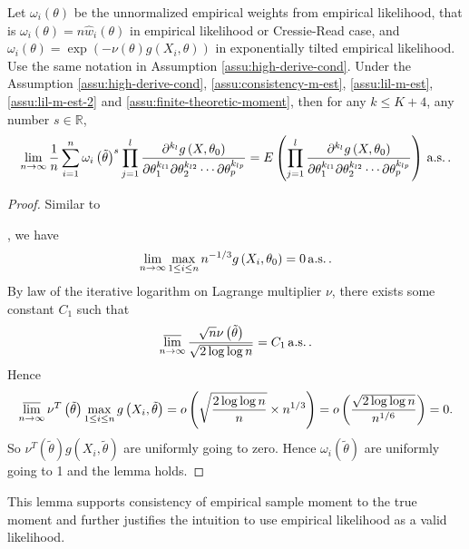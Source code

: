 \begin{lem}
\label{lem:finite-empirical-weight-moment}Let $\omega_{i}\left(\theta\right)$
be the unnormalized empirical weights from empirical likelihood, that
is $\omega_{i}\left(\theta\right)=n\hat{w}_{i}\left(\theta\right)$
in empirical likelihood or Cressie-Read case, and $\omega_{i}\left(\theta\right)=\exp\left(-\nu\left(\theta\right)g\left(X_{i},\theta\right)\right)$
in exponentially tilted empirical likelihood. Use the same notation
in Assumption \ref{assu:high-derive-cond}. Under the Assumption \ref{assu:high-derive-cond},
\ref{assu:consistency-m-est}, \ref{assu:lil-m-est}, \ref{assu:lil-m-est-2} and \ref{assu:finite-theoretic-moment},
then for any $k\le K+4$, any number $s\in\mathbb{R}$, 
\[
\lim_{n\rightarrow\infty}\frac{1}{n}\sum_{i=1}^{n}\omega_{i}\left(\tilde{\theta}\right)^{s}\prod_{j=1}^{l}\frac{\partial^{k_{l}}g\left(X,\theta_{0}\right)}{\partial\theta_{1}^{k_{l1}}\partial\theta_{2}^{k_{l2}}\cdots\partial\theta_{p}^{k_{lp}}}=E\left(\prod_{j=1}^{l}\frac{\partial^{k_{l}}g\left(X,\theta_{0}\right)}{\partial\theta_{1}^{k_{l1}}\partial\theta_{2}^{k_{l2}}\cdots\partial\theta_{p}^{k_{lp}}}\right)\,\mathrm{a.s.}\,.
\]
\end{lem}
\begin{proof}
Similar to%
\begin{comment}
add detail lemma number
\end{comment}
{} \citet{owen2010empirical}, we have 
\[
\lim_{n\rightarrow\infty}\max_{1\le i\le n}n^{-1/3}g\left(X_{i},\theta_{0}\right)=0\,\mathrm{a.s.}\,.
\]
By law of the iterative logarithm on Lagrange multiplier $\nu$, there
exists some constant $C_{1}$ such that 
\[
\varlimsup_{n\rightarrow\infty}\frac{\sqrt{n}\nu\left(\tilde{\theta}\right)}{\sqrt{2\log\log n}}=C_{1}\,\mathrm{a.s.}\,.
\]
Hence 
\[
\varlimsup_{n\rightarrow\infty}\nu^{T}\left(\tilde{\theta}\right)\max_{1\le i\le n}g\left(X_{i},\tilde{\theta}\right)=o\left(\sqrt{\frac{2\log\log n}{n}}\times n^{1/3}\right)=o\left(\frac{\sqrt{2\log\log n}}{n^{1/6}}\right)=0.
\]
So $\nu^{T}\left(\tilde{\theta}\right)g\left(X_{i},\tilde{\theta}\right)$
are uniformly going to zero. Hence $\omega_{i}\left(\tilde{\theta}\right)$
are uniformly going to 1 and the lemma holds.
\end{proof}
This lemma supports consistency of empirical sample moment to the true
moment and further justifies the intuition to use empirical likelihood
as a valid likelihood. 

